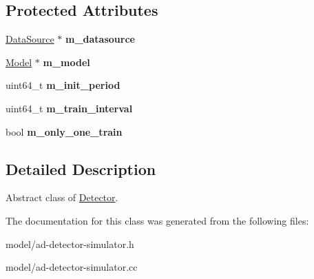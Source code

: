 \subsection*{Protected Attributes}
\begin{DoxyCompactItemize}
\item 
\hypertarget{classns3_1_1Detector_a1bd1b6fa34df0ffbbdc610bf4ddff639}{}\hyperlink{classns3_1_1DataSource}{Data\+Source} $\ast$ {\bfseries m\+\_\+datasource}\label{classns3_1_1Detector_a1bd1b6fa34df0ffbbdc610bf4ddff639}

\item 
\hypertarget{classns3_1_1Detector_abc82d62718c8cf93caf27faceff8a719}{}\hyperlink{classns3_1_1Model}{Model} $\ast$ {\bfseries m\+\_\+model}\label{classns3_1_1Detector_abc82d62718c8cf93caf27faceff8a719}

\item 
\hypertarget{classns3_1_1Detector_a08b2e35a9f6206b2ca25f674b09d9b9c}{}uint64\+\_\+t {\bfseries m\+\_\+init\+\_\+period}\label{classns3_1_1Detector_a08b2e35a9f6206b2ca25f674b09d9b9c}

\item 
\hypertarget{classns3_1_1Detector_a9833b6d578c0ec6b1d204307eaaa7267}{}uint64\+\_\+t {\bfseries m\+\_\+train\+\_\+interval}\label{classns3_1_1Detector_a9833b6d578c0ec6b1d204307eaaa7267}

\item 
\hypertarget{classns3_1_1Detector_a805685afe6ca85ebe299cdbc42696cc1}{}bool {\bfseries m\+\_\+only\+\_\+one\+\_\+train}\label{classns3_1_1Detector_a805685afe6ca85ebe299cdbc42696cc1}

\end{DoxyCompactItemize}


\subsection{Detailed Description}
Abstract class of \hyperlink{classns3_1_1Detector}{Detector}. 

The documentation for this class was generated from the following files\+:\begin{DoxyCompactItemize}
\item 
model/ad-\/detector-\/simulator.\+h\item 
model/ad-\/detector-\/simulator.\+cc\end{DoxyCompactItemize}
